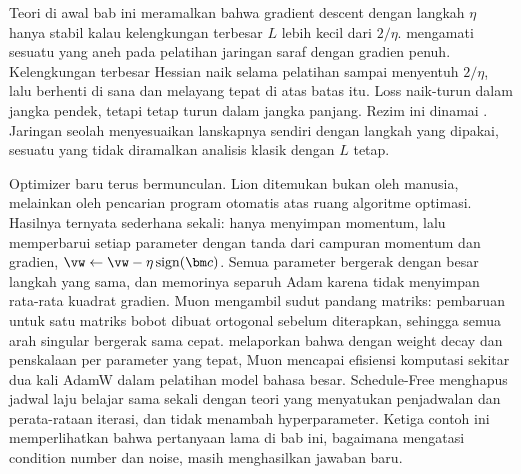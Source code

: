 Teori di awal bab ini meramalkan bahwa gradient descent dengan langkah $\eta$ hanya stabil kalau kelengkungan terbesar
$L$ lebih kecil dari $2/\eta$. \citet{cohen2021} mengamati sesuatu yang aneh pada pelatihan jaringan saraf dengan
gradien penuh. Kelengkungan terbesar Hessian naik selama pelatihan sampai menyentuh $2/\eta$, lalu berhenti di sana
dan melayang tepat di atas batas itu. Loss naik-turun dalam jangka pendek, tetapi tetap turun dalam jangka panjang.
Rezim ini dinamai . Jaringan seolah menyesuaikan lanskapnya sendiri dengan langkah yang
dipakai, sesuatu yang tidak diramalkan analisis klasik dengan $L$ tetap.

Optimizer baru terus bermunculan. Lion \citep{chen2023lion} ditemukan bukan oleh manusia, melainkan oleh pencarian
program otomatis atas ruang algoritme optimasi. Hasilnya ternyata sederhana sekali: hanya menyimpan momentum, lalu
memperbarui setiap parameter dengan tanda dari campuran momentum dan gradien, $\vw\leftarrow\vw-\eta\,\mathrm{sign}(\bm c)$.
Semua parameter bergerak dengan besar langkah yang sama, dan memorinya separuh Adam karena tidak menyimpan rata-rata
kuadrat gradien. Muon mengambil sudut pandang matriks: pembaruan untuk satu matriks bobot dibuat ortogonal sebelum
diterapkan, sehingga semua arah singular bergerak sama cepat. \citet{liu2025muon} melaporkan bahwa dengan weight decay
dan penskalaan per parameter yang tepat, Muon mencapai efisiensi komputasi sekitar dua kali AdamW dalam pelatihan model
bahasa besar. Schedule-Free \citep{defazio2024} menghapus jadwal laju belajar sama sekali dengan teori yang menyatukan
penjadwalan dan perata-rataan iterasi, dan tidak menambah hyperparameter. Ketiga contoh ini memperlihatkan bahwa
pertanyaan lama di bab ini, bagaimana mengatasi condition number dan noise, masih menghasilkan jawaban baru.

